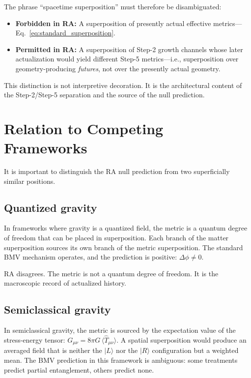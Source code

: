 \documentclass[12pt,a4paper]{article}
\begin{document}
The phrase ``spacetime superposition'' must therefore be
disambiguated:

\begin{itemize}[nosep]
\item \textbf{Forbidden in RA:} A superposition of presently actual
effective metrics---Eq.~\eqref{eq:standard_superposition}.
\item \textbf{Permitted in RA:} A superposition of Step-2
growth channels whose later actualization would yield different
Step-5 metrics---i.e., superposition over geometry-producing
\emph{futures}, not over the presently actual geometry.
\end{itemize}

This distinction is not interpretive decoration. It is the
architectural content of the Step-2/Step-5 separation and the source
of the null prediction.

\section{Relation to Competing Frameworks}
\label{sec:comparison}

It is important to distinguish the RA null prediction from two
superficially similar positions.

\subsection{Quantized gravity}

In frameworks where gravity is a quantized field, the metric is a
quantum degree of freedom that can be placed in superposition. Each
branch of the matter superposition sources its own branch of the
metric superposition. The standard BMV mechanism operates, and the
prediction is positive: $\Delta\phi \neq 0$.

RA disagrees. The metric is not a quantum degree of freedom. It is
the macroscopic record of actualized history.

\subsection{Semiclassical gravity}

In semiclassical gravity, the metric is sourced by the expectation
value of the stress-energy tensor:
$G_{\mu\nu} = 8\pi G\, \langle\hat{T}_{\mu\nu}\rangle$.
A spatial superposition would produce an averaged field that is
neither the $|L\rangle$ nor the $|R\rangle$ configuration but a
weighted mean. The BMV prediction in this framework is ambiguous:
some treatments predict partial entanglement, others predict none.
\end{document}
